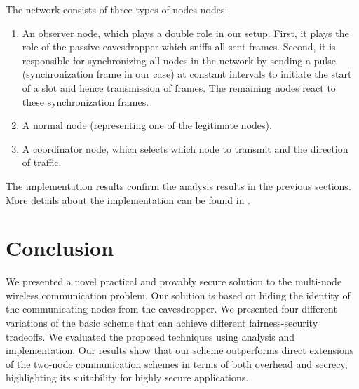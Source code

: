 \documentclass[10pt,letterpaper,conference]{IEEEtran}
\begin{document}
The network consists of three types of nodes nodes:

\begin{enumerate}
\item An observer node, which plays a double role in our setup. First, it
plays the role of the passive eavesdropper which sniffs all sent frames.
Second, it is responsible for synchronizing all nodes in the network by sending
a pulse (synchronization frame in our case) at constant intervals to initiate the
start of a slot and hence transmission of frames. The remaining nodes react to
 these synchronization frames.

\item A normal node (representing one of the  legitimate nodes).

\item A coordinator node, which selects which node to transmit and the direction of traffic.
\end{enumerate}

The implementation results confirm the analysis results in the previous sections. More details about the implementation can be found in \cite{multinode_demo}.

\section{Conclusion}
\label{sec:conclude}
We presented a novel practical and provably secure solution to the multi-node wireless communication problem. Our solution is based on hiding the identity of the communicating nodes from the eavesdropper. We presented four different variations of the basic scheme that can achieve different fairness-security tradeoffs.
We evaluated the proposed techniques using analysis and implementation. Our results show that our scheme outperforms direct extensions of the two-node communication schemes in terms of both overhead and secrecy, highlighting its suitability for highly secure applications.
\end{document}
